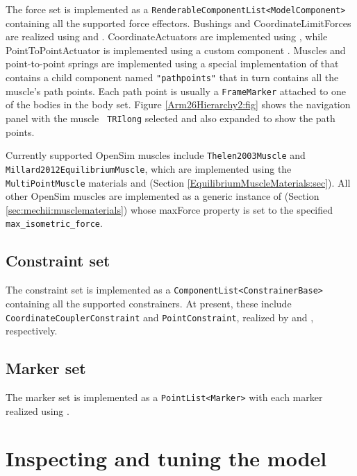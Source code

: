The force set is implemented as a {\tt RenderableComponentList<ModelComponent>}
containing all the supported force effectors. Bushings and
CoordinateLimitForces are realized using  and
. 
CoordinateActuators are implemented using
, while
PointToPointActuator is implemented using a
custom component
.
Muscles and point-to-point springs are implemented using a special
implementation of
 that contains a child
component named {\tt "pathpoints"} that in turn contains all the muscle's path
points. Each path point is usually a {\tt FrameMarker} attached to one
of the bodies in the body set. Figure
\ref{Arm26Hierarchy2:fig} shows the navigation panel with the muscle {\tt
TRIlong} selected and also expanded to show the path points.

Currently supported OpenSim muscles include {\tt Thelen2003Muscle} and {\tt
Millard2012EquilibriumMuscle}, which are implemented using the {\tt
MultiPointMuscle} materials
 and 
(Section \ref{EquilibriumMuscleMaterials:sec}).
All other OpenSim muscles are implemented as a generic
instance of
(Section \ref{sec:mechii:musclematerials}) whose {\sf maxForce} property is set
to the specified {\tt max\_isometric\_force}.

\subsection{Constraint set}

The constraint set is implemented as a {\tt ComponentList<ConstrainerBase>}
containing all the supported constrainers. At present, these include {\tt
CoordinateCouplerConstraint} and {\tt PointConstraint}, realized by
 and
, respectively.

\subsection{Marker set}

The marker set is implemented as a {\tt PointList<Marker>} with each marker
realized using .

\section{Inspecting and tuning the model}
\label{inspectingAndTuning:sec}

